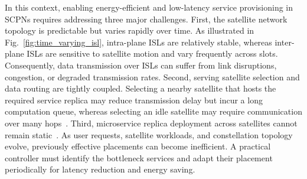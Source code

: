 \documentclass[10pt, conference, letterpaper]{IEEEtran}
\begin{document}

In this context, enabling energy-efficient and low-latency service provisioning in SCPNs requires addressing three major challenges.
First, the satellite network topology is predictable but varies rapidly over time. As illustrated in Fig.~\ref{fig:time_varying_isl}, intra-plane ISLs are relatively stable, whereas inter-plane ISLs are sensitive to satellite motion and vary frequently across slots. Consequently, data transmission over ISLs can suffer from link disruptions, congestion, or degraded transmission rates.
Second, serving satellite selection and data routing are tightly coupled. Selecting a nearby satellite that hosts the required service replica may reduce transmission delay but incur a long computation queue, whereas selecting an idle satellite may require communication over many hops~\cite{energy_efficient_routing_tsinghua,cao_comp_routing}.
Third, microservice replica deployment across satellites cannot remain static~\cite{yu_deploy_tmc2025}. As user requests, satellite workloads, and constellation topology evolve, previously effective placements can become inefficient. 
A practical controller must identify the bottleneck services and adapt their placement periodically for latency reduction and energy saving.
\end{document}
